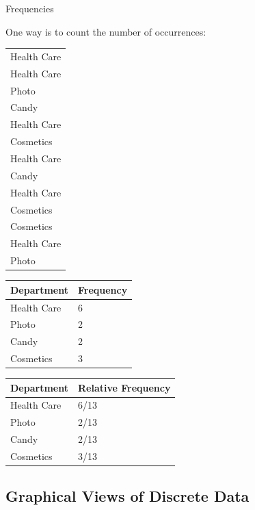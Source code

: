 \begin{frame}{Frequencies}

  One way is to count the number of occurrences: \\
  {
    \begin{tabular}{l}
      Health Care \\
      Health Care \\
      Photo \\
      Candy \\
      Health Care \\
      Cosmetics \\
      Health Care \\
      Candy \\
      Health Care \\
      Cosmetics \\
      Cosmetics \\
      Health Care \\
      Photo 
    \end{tabular}
  }


  {
    \begin{tabular}{l|l}
      Department  & Frequency \\ \hline
      Health Care & 6 \\
      Photo       & 2 \\
      Candy       & 2 \\
      Cosmetics   & 3 \\
    \end{tabular}
  }


  {
    \begin{tabular}{l|l}
      Department  & Relative Frequency \\ \hline
      Health Care & 6/13 \\
      Photo       & 2/13 \\
      Candy       & 2/13 \\
      Cosmetics   & 3/13 \\
    \end{tabular}
  }

  
\end{frame}


\subsection{Graphical Views of Discrete Data}

